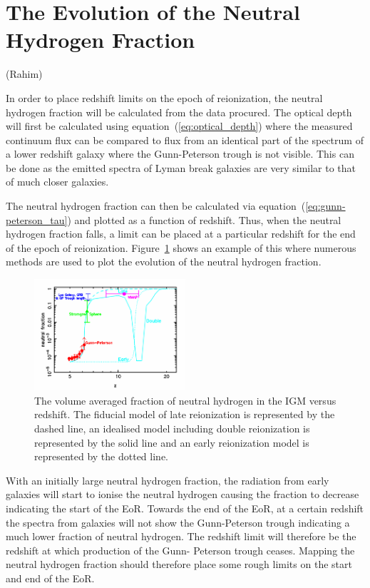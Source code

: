 \section{The Evolution of the Neutral Hydrogen Fraction} %
\label{sec:the_evolution_of_the_neutral_hydrogen_fraction}
(Rahim)

	In order to place redshift limits on the epoch of reionization, the neutral hydrogen fraction will be calculated from the data procured. The optical depth will first be calculated using equation~(\ref{eq:optical_depth}) where the measured continuum flux can be compared to flux from an identical part of the spectrum of a lower redshift galaxy where the Gunn-Peterson trough is not visible. This can be done as the emitted spectra of Lyman break galaxies are very similar to that of much closer galaxies.

	The neutral hydrogen fraction can then be calculated via equation~(\ref{eq:gunn-peterson_tau}) and plotted as a function of redshift. Thus, when the neutral hydrogen fraction falls, a limit can be placed at a particular redshift for the end of the epoch of reionization. Figure~\ref{fig:Evolution_Xh1} shows an example of this where numerous methods are used to plot the evolution of the neutral hydrogen fraction\cite{Fanetal}.
	\begin{figure}[htbp]
		\centering
		\includegraphics[width=0.5\textwidth]{../Images/Evolution_Xh1.png}
		\caption{The volume averaged fraction of neutral hydrogen in the IGM versus redshift. The fiducial model of late reionization is represented by the dashed line, an idealised model including double reionization is represented by the solid line and an early reionization model is represented by the dotted line.}\label{fig:Evolution_Xh1}
	\end{figure}

	With an initially large neutral hydrogen fraction, the radiation from early galaxies will start to ionise the neutral hydrogen causing the fraction to decrease indicating the start of the EoR. Towards the end of the EoR, at a certain redshift the spectra from galaxies will not show the Gunn-Peterson trough indicating a much lower fraction of neutral hydrogen. The redshift limit will therefore be the redshift at which production of the Gunn- Peterson trough ceases. Mapping the neutral hydrogen fraction should therefore place some rough limits on the start and end of the EoR.


